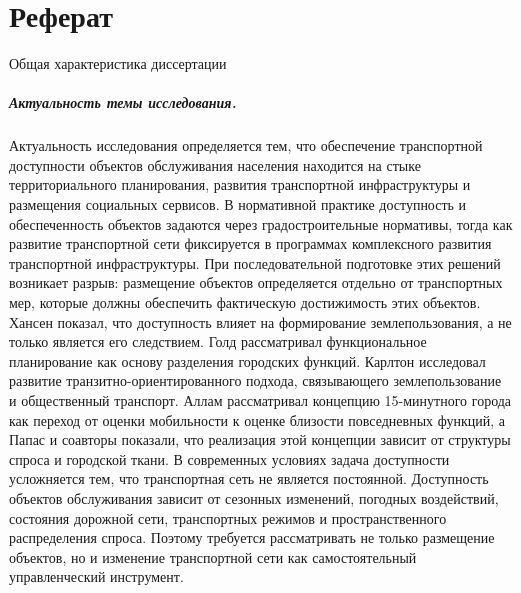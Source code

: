 \chapter*{Реферат}

\begin{center}
    Общая характеристика диссертации
\end{center}



\paragraph*{Актуальность темы исследования.}
Актуальность исследования определяется тем, что обеспечение транспортной доступности объектов обслуживания населения находится на стыке территориального планирования, развития транспортной инфраструктуры и размещения социальных сервисов. В нормативной практике доступность и обеспеченность объектов задаются через градостроительные нормативы, тогда как развитие транспортной сети фиксируется в программах комплексного развития транспортной инфраструктуры. При последовательной подготовке этих решений возникает разрыв: размещение объектов определяется отдельно от транспортных мер, которые должны обеспечить фактическую достижимость этих объектов.
Хансен показал, что доступность влияет на формирование землепользования, а не только является его следствием. Голд рассматривал функциональное планирование как основу разделения городских функций. Карлтон исследовал развитие транзитно-ориентированного подхода, связывающего землепользование и общественный транспорт. Аллам рассматривал концепцию 15-минутного города как переход от оценки мобильности к оценке близости повседневных функций, а Папас и соавторы показали, что реализация этой концепции зависит от структуры спроса и городской ткани.
В современных условиях задача доступности усложняется тем, что транспортная сеть не является постоянной. Доступность объектов обслуживания зависит от сезонных изменений, погодных воздействий, состояния дорожной сети, транспортных режимов и пространственного распределения спроса. Поэтому требуется рассматривать не только размещение объектов, но и изменение транспортной сети как самостоятельный управленческий инструмент.


